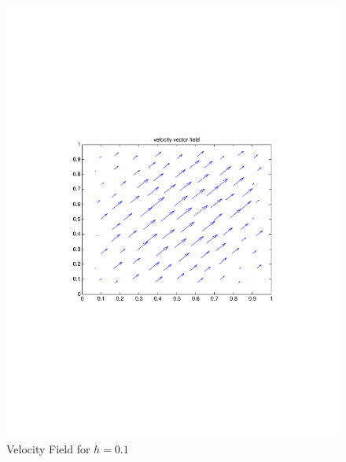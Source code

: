 \documentclass[12pt]{article}
\begin{document}
                \begin{figure}[htb]
                    \begin{center}
                \includegraphics[scale=0.50]{./../files/box/1q.pdf}
                \caption{Velocity Field for $h = 0.1$}
            \end{center}
            \end{figure}
\end{document}
